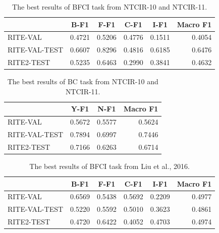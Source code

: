 \documentclass[12pt]{article}
\begin{document}
\begin{CJK*}{UTF8}{bkai}
\begin{spacing}{1.77}
\begin{table}[ht!]
  \centering
  \begin{tabular}{|l|r|r|r|r|r|}
  \hline
   & \multicolumn{1}{c|}{B-F1} & \multicolumn{1}{c|}{F-F1} & \multicolumn{1}{c|}{C-F1} & \multicolumn{1}{c|}{I-F1} & \multicolumn{1}{c|}{Macro F1} \\ \hline
  RITE-VAL & 0.4721 & 0.5206 & 0.4776 & 0.1511 & 0.4054 \\ \hline
  RITE-VAL-TEST & 0.6607 & 0.8296 & 0.4816 & 0.6185 & 0.6476 \\ \hline
  RITE2-TEST & 0.5235 & 0.6463 & 0.2990 & 0.3841 & 0.4632 \\ \hline
  \end{tabular}
  \caption{The best results of BFCI task from NTCIR-10 and NTCIR-11.}
  \label{result:bfci_ntcir}
\end{table}

\begin{table}[ht!]
  \centering
  \begin{tabular}{|l|r|r|r|}
  \hline
   & \multicolumn{1}{c|}{Y-F1} & \multicolumn{1}{c|}{N-F1} & \multicolumn{1}{c|}{Macro F1} \\ \hline
  RITE-VAL & 0.5672 & 0.5577 & 0.5624 \\ \hline
  RITE-VAL-TEST & 0.7894 & 0.6997 & 0.7446 \\ \hline
  RITE2-TEST & 0.7166 & 0.6263 & 0.6714 \\ \hline
  \end{tabular}
  \caption{The best results of BC task from NTCIR-10 and NTCIR-11.}
  \label{result:bc_ntcir}
\end{table}

\begin{table}[ht!]
  \centering
  \begin{tabular}{|l|r|r|r|r|r|}
  \hline
   & \multicolumn{1}{c|}{B-F1} & \multicolumn{1}{c|}{F-F1} & \multicolumn{1}{c|}{C-F1} & \multicolumn{1}{c|}{I-F1} & \multicolumn{1}{c|}{Macro F1} \\ \hline
  RITE-VAL & 0.6569 & 0.5438 & 0.5692 & 0.2209 & 0.4977 \\ \hline
  RITE-VAL-TEST & 0.5220 & 0.5592 & 0.5010 & 0.3623 & 0.4861 \\ \hline
  RITE2-TEST & 0.4720 & 0.6422 & 0.4052 & 0.4703 & 0.4974 \\ \hline
  \end{tabular}
  \caption{The best results of BFCI task from Liu et al., 2016.}
  \label{result:bfci_liu_2016}
\end{table}


\end{spacing}
\end{CJK*}
\end{document}
